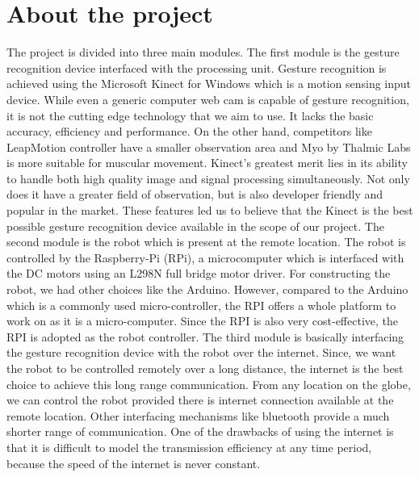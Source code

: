 \section{About the project} %
The project is divided into three main modules. The first module is the gesture recognition device interfaced with the processing unit. Gesture recognition is achieved using the Microsoft Kinect for Windows which is a motion sensing input device. While even a generic computer web cam is capable of gesture recognition, it is not the cutting edge technology that we aim to use. It lacks the basic accuracy, efficiency and performance. On the other hand, competitors like LeapMotion controller have a smaller observation area and Myo by Thalmic Labs is more suitable for muscular movement. Kinect's greatest merit lies in its ability to handle both high quality image and signal processing simultaneously. Not only does it have a greater field of observation, but is also developer friendly and popular in the market. These features led us to believe that the Kinect is the best possible gesture recognition device available in the scope of our project.\linebreak \linebreak
 The second module is the robot which is present at the remote location. The robot is controlled by the Raspberry-Pi (RPi), a microcomputer which is interfaced with the DC motors using an L298N full bridge motor driver. For constructing the robot, we had other choices like the Arduino. However, compared to the Arduino which is a commonly used micro-controller, the RPI offers a whole platform to work on as it is a micro-computer. Since the RPI is also very cost-effective, the RPI is adopted as the robot controller. \linebreak \linebreak
 The third module is basically interfacing the gesture recognition device with the robot over the internet. Since, we want the robot to be controlled remotely over a long distance, the internet is the best choice to achieve this long range communication. From any location on the globe, we can control the robot provided there is internet connection available at the remote location. Other interfacing mechanisms like bluetooth provide a much shorter range of communication. One of the drawbacks of using the internet is that it is difficult to model the transmission efficiency at any time period, because the speed of the internet is never constant.


